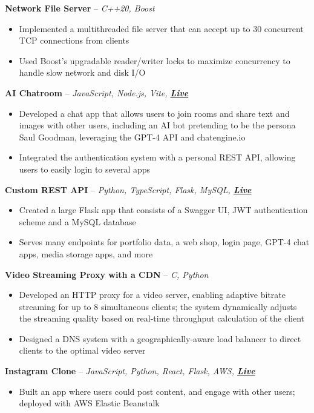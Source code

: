 \documentclass[a4paper,11pt]{article}
\newcommand{\resumeProject}[2]{
\vspace{0.5mm}\item
    \textbf{#1} -- \textit{\small{#2}} %
    \vspace{-2.4mm}
}
\newcommand{\resumeItemListStart}{\begin{justify}\begin{itemize}[leftmargin=3ex, rightmargin=2ex, noitemsep,labelsep=1.2mm,itemsep=0mm]\small}
\newcommand{\resumeItemListEnd}{\end{itemize}\end{justify}\vspace{-5mm}}
\newcommand{\website}{https://btschwartz.com} %
\begin{document}
    \resumeProject
        {Network File Server} %
        {C++20, Boost} 
    \resumeItemListStart
        \item {Implemented a multithreaded file server that can accept up to 30 concurrent TCP connections from clients}
        \item {Used Boost's upgradable reader/writer locks to maximize concurrency to handle slow network and disk I/O}
    \resumeItemListEnd

     

    \resumeProject
        {AI Chatroom} %
        {JavaScript, Node.js, Vite, \href{https://chat.btschwartz.com}{\textbf{\textcolor{websiteColor}{Live}}}} %
    \resumeItemListStart
        \item {Developed a chat app that allows users to join rooms and share text and images with other users, including an AI bot pretending to be the persona Saul Goodman, leveraging the GPT-4 API and chatengine.io}
        \item {Integrated the authentication system with a personal REST API, allowing users to easily login to several apps}
    \resumeItemListEnd
    \resumeProject
        {Custom REST API} %
        {Python, TypeScript, Flask, MySQL, \href{\website/api/v1/}{\textbf{\textcolor{websiteColor}{Live}}}}
        \resumeItemListStart
        \item {Created a large Flask app that consists of a Swagger UI, JWT authentication scheme and a MySQL database}
        \item {Serves many endpoints for portfolio data, a web shop, login page, GPT-4 chat apps, media storage apps, and more}
    \resumeItemListEnd
    \resumeProject
        {Video Streaming Proxy with a CDN} %
        {C, Python}
        \resumeItemListStart
        \item {Developed an HTTP proxy for a video server, enabling adaptive bitrate streaming for up to 8 simultaneous clients; the system dynamically adjusts the streaming quality based on real-time throughput calculation of the client}
        \item {Designed a DNS system with a geographically-aware load balancer to direct clients to the optimal video server}
    \resumeItemListEnd

    \resumeProject
        {Instagram Clone} %
        {JavaScript, Python, React, Flask, AWS, \href{\website/insta}{\textbf{\textcolor{websiteColor}{Live}}}} %
    \resumeItemListStart
        \item {Built an app where users could post content, and engage with other users; deployed with AWS Elastic Beanstalk}
    \resumeItemListEnd
    
\end{document}
